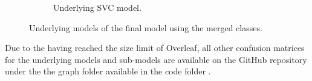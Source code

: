\begin{figure}[ht]
\begin{subfigure}{.45\textwidth}
        \captionsetup{width=0.8\linewidth}
        \captionsetup{justification=centering}
        \caption{Underlying SVC model.}
    \end{subfigure}
    \captionsetup{width=0.9\linewidth}
    \captionsetup{justification=centering}
    \caption{Underlying models of the final model using the merged classes.}
\end{figure}

Due to the having reached the size limit of Overleaf, all other confusion matrices for the underlying models and sub-models are available on the GitHub repository under the the graph folder available in the code folder \citep{github_project}.